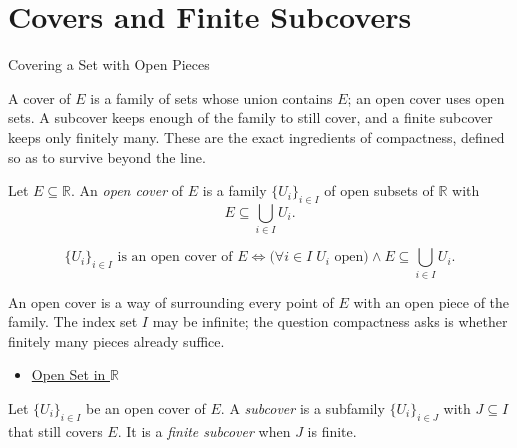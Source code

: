 \section{Covers and Finite Subcovers}
\label{sec:covers-and-subcovers}

\begin{topicbox}{Covering a Set with Open Pieces}
\begin{exposition}
A cover of $E$ is a family of sets whose union contains $E$; an open cover uses open sets. A subcover keeps enough of the family to still cover, and a finite subcover keeps only finitely many. These are the exact ingredients of compactness, defined so as to survive beyond the line.
\end{exposition}
\end{topicbox}
\begin{tcolorbox}[colback=defbox, colframe=defborder, arc=2pt,
  left=6pt, right=6pt, top=4pt, bottom=4pt,
  title={\small\textbf{Definition (Open Cover)}},
  fonttitle=\small\bfseries]
\begin{definition}
\label{def:open-cover}
Let $E\subseteq\mathbb{R}$. An \emph{open cover} of $E$ is a family $\{U_{i}\}_{i\in I}$ of open subsets of $\mathbb{R}$ with
\[
E\subseteq\bigcup_{i\in I} U_{i}.
\]
\end{definition}
\end{tcolorbox}
\begin{remark*}
\[
\{U_i\}_{i\in I} \text{ is an open cover of } E \Longleftrightarrow \bigl(\forall i\in I\;U_i \text{ open}\bigr)\land E\subseteq\textstyle\bigcup_{i\in I}U_i.
\]
\end{remark*}
\begin{remark*}[Interpretation]
An open cover is a way of surrounding every point of $E$ with an open piece of the family. The index set $I$ may be infinite; the question compactness asks is whether finitely many pieces already suffice.
\end{remark*}
\begin{dependencies}
\begin{itemize}
  \item \hyperref[def:open-set]{Open Set in $\mathbb{R}$}
\end{itemize}
\end{dependencies}
\begin{tcolorbox}[colback=defbox, colframe=defborder, arc=2pt,
  left=6pt, right=6pt, top=4pt, bottom=4pt,
  title={\small\textbf{Definition (Subcover and Finite Subcover)}},
  fonttitle=\small\bfseries]
\begin{definition}
\label{def:finite-subcover}
Let $\{U_{i}\}_{i\in I}$ be an open cover of $E$. A \emph{subcover} is a subfamily $\{U_{i}\}_{i\in J}$ with $J\subseteq I$ that still covers $E$. It is a \emph{finite subcover} when $J$ is finite.
\end{definition}
\end{tcolorbox}
